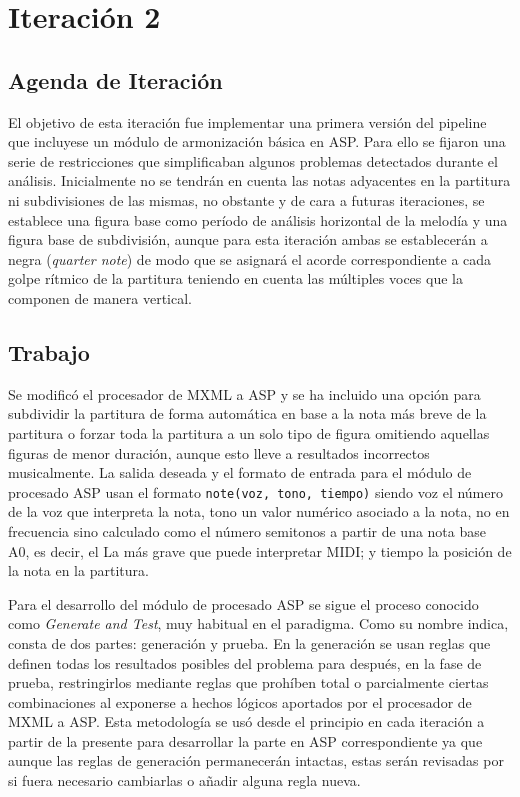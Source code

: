 \section{Iteración 2}
\label{sec:second_iteration}
\subsection{Agenda de Iteración}
\label{subsec:second_iteration_backlog}
El objetivo de esta iteración fue implementar una primera versión del pipeline que incluyese un módulo de armonización básica en ASP. Para ello se fijaron una serie de restricciones que simplificaban algunos problemas detectados durante el análisis. Inicialmente no se tendrán en cuenta las notas adyacentes en la partitura ni subdivisiones de las mismas, no obstante y de cara a futuras iteraciones, se establece una figura base como período de análisis horizontal de la melodía y una figura base de subdivisión, aunque para esta iteración ambas se establecerán a negra (\textit{quarter note}) de modo que se asignará el acorde correspondiente a cada golpe rítmico de la partitura teniendo en cuenta las múltiples voces que la componen de manera vertical.

\subsection{Trabajo}
\label{subsec:second_iteration_work}
Se modificó el procesador de MXML a ASP y se ha incluido una opción para subdividir la partitura de forma automática en base a la nota más breve de la partitura o forzar toda la partitura a un solo tipo de figura omitiendo aquellas figuras de menor duración, aunque esto lleve a resultados incorrectos musicalmente. La salida deseada y el formato de entrada para el módulo de procesado ASP usan el formato \texttt{note(voz, tono, tiempo)} siendo voz el número de la voz que interpreta la nota, tono un valor numérico asociado a la nota, no en frecuencia sino calculado como el número semitonos a partir de una nota base A0, es decir, el La más grave que puede interpretar MIDI; y tiempo la posición de la nota en la partitura.

Para el desarrollo del módulo de procesado ASP se sigue el proceso conocido como \textit{Generate and Test}, muy habitual en el paradigma. Como su nombre indica, consta de dos partes: generación y prueba. En la generación se usan reglas que definen todas los resultados posibles del problema para después, en la fase de prueba, restringirlos mediante reglas que prohíben total o parcialmente ciertas combinaciones al exponerse a hechos lógicos aportados por el procesador de MXML a ASP. Esta metodología se usó desde el principio en cada iteración a partir de la presente para desarrollar la parte en ASP correspondiente ya que aunque las reglas de generación permanecerán intactas, estas serán revisadas por si fuera necesario cambiarlas o añadir alguna regla nueva.

